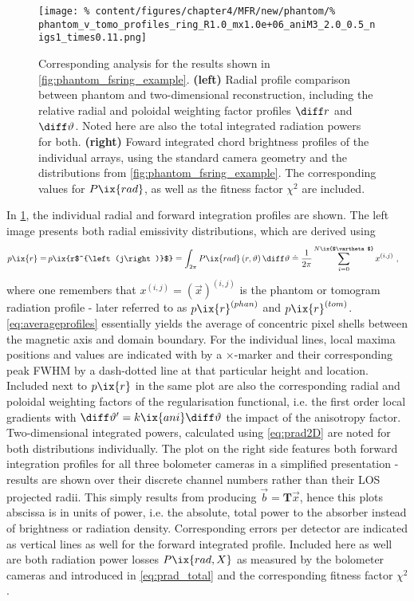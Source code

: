 %
           \begin{figure}[t]%
               \centering%
               \texttt{[image: \%
                   content/figures/chapter4/MFR/new/phantom/\%
                   phantom\_v\_tomo\_profiles\_ring\_R1.0\_mx1.0e+06\_aniM3\_2.0\_0.5\_nigs1\_times0.11.png]}%
               \caption{Corresponding analysis for the results shown in \cref{fig:phantom_fsring_example}. \textbf{(left)} Radial profile comparison between phantom and two-dimensional reconstruction, including the relative radial and poloidal weighting factor profiles $\diff r$ and $\diff\vartheta$. Noted here are also the total integrated radiation powers for both. \textbf{(right)} Foward integrated chord brightness profiles of the individual arrays, using the standard camera geometry and the distributions from \cref{fig:phantom_fsring_example}. The corresponding values for $P\ix{rad}$, as well as the fitness factor $\chi^2$ are included.}\label{fig:phantom_fsring_example_profiles}%
           \end{figure}%
%
           In \cref{fig:phantom_fsring_example_profiles}, the individual radial and forward integration profiles are shown. The left image presents both radial emissivity distributions, which are derived using%
%
           \begin{align}%
                p\ix{r}=\,&p\ix{r$^{\left(j\right)}$}=\int_{2\pi}P\ix{rad}\left(r,\vartheta\right)\diff\vartheta%
                \mathrel{\hat{=}}\frac{1}{2\pi}\sum_{i=0}^{N\ix{$\vartheta$}}x^{\left(i,j\right)}\,\,,\label{eq:averageprofiles}%
           \end{align}%
%
           where one remembers that $x^{\left(i,j\right)}=\left(\vec{x}\right)^{\left(i,j\right)}$ is the phantom or tomogram radiation profile - later referred to as $p\ix{r}^{\left(phan\right)}$ and $p\ix{r}^{\left(tom\right)}$. \autoref{eq:averageprofiles} essentially yields the average of concentric pixel shells between the magnetic axis and domain boundary. For the individual lines, local maxima positions and values are indicated with by a $\times$-marker and their corresponding peak FWHM by a dash-dotted line at that particular height and location. Included next to $p\ix{r}$ in the same plot are also the corresponding radial and poloidal weighting factors of the regularisation functional, i.e. the first order local gradients with $\diff\vartheta^{\prime}=k\ix{ani}\diff\vartheta$ the impact of the anisotropy factor. Two-dimensional integrated powers, calculated using \cref{eq:prad2D} are noted for both distributions individually. The plot on the right side features both forward integration profiles for all three bolometer cameras in a simplified presentation - results are shown over their discrete channel numbers rather than their LOS projected radii. This simply results from producing $\vec{b}=\mathbf{T}\vec{x}$, hence this plots abscissa is in units of power, i.e. the absolute, total power to the absorber instead of brightness or radiation density. Corresponding errors per detector are indicated as vertical lines as well for the forward integrated profile. Included here as well are both radiation power losses $P\ix{rad,X}$ as measured by the bolometer cameras and introduced in \cref{eq:prad_total} and the corresponding fitness factor $\chi^{2}$.\\%
